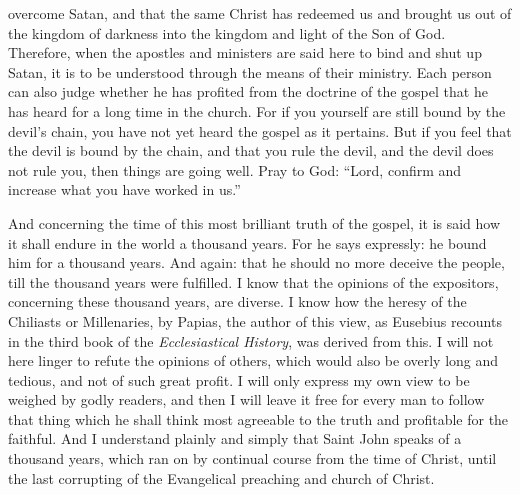 overcome Satan, and that the same Christ has redeemed us and brought us out of the kingdom of darkness into the kingdom and light of the Son of God. Therefore, when the apostles and ministers are said here to bind and shut up Satan, it is to be understood through the means of their ministry. Each person can also judge whether he has profited from the doctrine of the gospel that he has heard for a long time in the church. For if you yourself are still bound by the devil’s chain, you have not yet heard the gospel as it pertains. But if you feel that the devil is bound by the chain, and that you rule the devil, and the devil does not rule you, then things are going well. Pray to God: “Lord, confirm and increase what you have worked in us.”

And concerning the time of this most brilliant truth of the gospel, it is said how it shall endure in the world a thousand years. For he says expressly: he bound him for a thousand years. And again: that he should no more deceive the people, till the thousand years were fulfilled. I know that the opinions of the expositors, concerning these thousand years, are diverse. I know how the heresy of the Chiliasts or Millenaries, by Papias, the author of this view, as Eusebius recounts in the third book of the \textit{Ecclesiastical History}, was derived from this. I will not here linger to refute the opinions of others, which would also be overly long and tedious, and not of such great profit. I will only express my own view to be weighed by godly readers, and then I will leave it free for every man to follow that thing which he shall think most agreeable to the truth and profitable for the faithful. And I understand plainly and simply that Saint John speaks of a thousand years, which ran on by continual course from the time of Christ, until the last corrupting of the Evangelical preaching and church of Christ.

